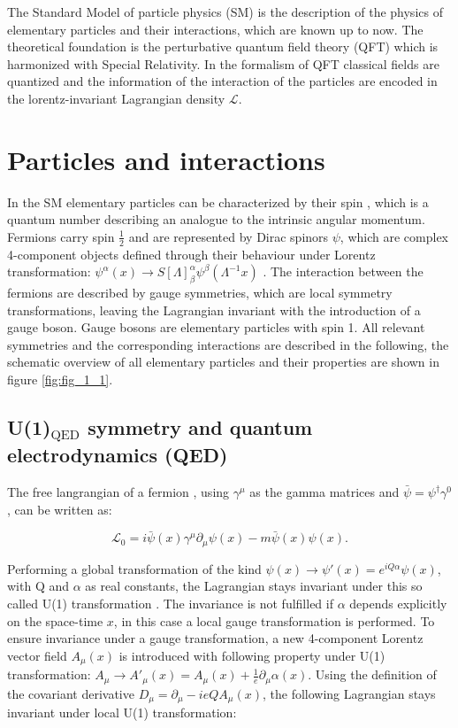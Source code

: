 The Standard Model of particle physics (\gls{SM}) \cite{SM} is the description of the physics of elementary particles and their interactions, which are known up to now. The theoretical foundation is the perturbative quantum field theory (\gls{QFT}) which is harmonized with Special Relativity. In the formalism of \gls{QFT} classical fields are quantized and the information of the interaction of the particles are encoded in the lorentz-invariant Lagrangian density $\mathcal{L}$. 



\section{Particles and interactions}
\label{sec:section_1_1}

In the \gls{SM} elementary particles can be characterized by their spin \cite{SPIN}, which is a quantum number describing an analogue to the intrinsic angular momentum. Fermions carry spin $\frac{1}{2}$ and are represented by Dirac spinors $\psi$, which are complex 4-component objects defined through their behaviour under Lorentz transformation: $\psi^{\alpha}(x) \rightarrow S[\Lambda]^{\alpha}_{\beta} \psi^{\beta}(\Lambda^{-1}x)$ \cite{spinor}. The interaction between the fermions are described by gauge symmetries, which are local symmetry transformations, leaving the Lagrangian invariant with the introduction of a gauge boson. Gauge bosons are elementary particles with spin 1. All relevant symmetries and the corresponding interactions are described in the following, the schematic overview of all elementary particles and their properties are shown in figure \ref{fig:fig_1_1}.

\subsection{U(1)${_{\text{QED}}}$ symmetry and quantum electrodynamics (\gls{QED})}
\label{sec:section_1_1_1}

The free langrangian of a fermion \cite{Peskin}, using $\gamma^{\mu}$ as the gamma matrices and $\bar{\psi} = \psi^{\dagger}\gamma^{0}$, can be written as:

\begin{equation}
	\label{eq:eq_1_1}
	\mathcal{L}_{0} =  i\bar{\psi}(x)\gamma^{\mu}\partial_{\mu}\psi(x) - m\bar{\psi}(x)\psi(x).
\end{equation}

Performing a global transformation of the kind $\psi(x) \rightarrow \psi'(x) = e^{iQ\alpha}\psi(x)$, with Q and $\alpha$ as real constants, the Lagrangian stays invariant under this so called U(1) transformation \cite{SM}. The invariance is not fulfilled if $\alpha$ depends explicitly on the space-time $x$, in this case a local gauge transformation is performed. To ensure invariance under a gauge transformation, a new 4-component Lorentz vector field $A_{\mu}(x)$ is introduced with following property under U(1) transformation: $A_{\mu} \rightarrow A'_{\mu}(x) = A_{\mu}(x) + \frac{1}{e}\partial_{\mu}\alpha(x)$. Using the definition of the covariant derivative $D_{\mu} = \partial_{\mu} - ieQA_{\mu}(x)$, the following Lagrangian stays invariant under local U(1) transformation:


